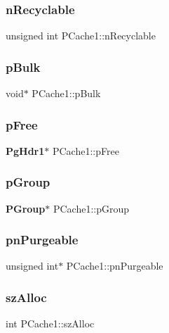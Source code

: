 \mbox{\label{struct_p_cache1_a3501394bd251f08d1f9d26d3b2d4c67c}} 
\subsubsection{nRecyclable}
{\footnotesize\ttfamily unsigned int P\+Cache1\+::n\+Recyclable}

\mbox{\label{struct_p_cache1_a32591cc3f60587a1422627a080109fb7}} 
\subsubsection{pBulk}
{\footnotesize\ttfamily void$\ast$ P\+Cache1\+::p\+Bulk}

\mbox{\label{struct_p_cache1_a91dcc2d2771fa17cf065a1f9ff427d5f}} 
\subsubsection{pFree}
{\footnotesize\ttfamily \textbf{ Pg\+Hdr1}$\ast$ P\+Cache1\+::p\+Free}

\mbox{\label{struct_p_cache1_ae3389f0c68d6946a1eebeeee835ece69}} 
\subsubsection{pGroup}
{\footnotesize\ttfamily \textbf{ P\+Group}$\ast$ P\+Cache1\+::p\+Group}

\mbox{\label{struct_p_cache1_aa9e211d2615e2be9c4db1531891c9ff1}} 
\subsubsection{pnPurgeable}
{\footnotesize\ttfamily unsigned int$\ast$ P\+Cache1\+::pn\+Purgeable}

\mbox{\label{struct_p_cache1_aa40b14da40f3c940978af20e99500000}} 
\subsubsection{szAlloc}
{\footnotesize\ttfamily int P\+Cache1\+::sz\+Alloc}

